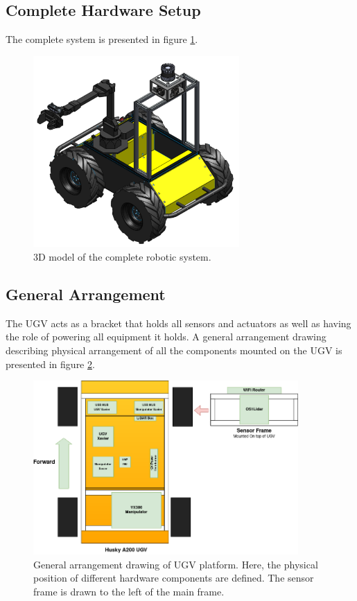 \subsection{Complete Hardware Setup}

The complete system is presented in figure \ref{fig:hardware}.

\begin{figure}[H]
  \centering
  \includegraphics[width = 0.7\textwidth]{Figures/husky_completed.pdf}
  \caption{3D model of the complete robotic system.}
  \label{fig:hardware}
\end{figure}

\subsection{General Arrangement}
The UGV acts as a bracket that holds all sensors and actuators as well as having the role of powering all equipment it holds. A general arrangement drawing describing physical arrangement of all the components mounted on the UGV is presented in figure \ref{fig:general_arrangement}.

\begin{figure}[H]
  \centering
   \includegraphics[width = 0.9\textwidth]{Figures/general_arrangement.drawio.png}
  \caption{General arrangement drawing of UGV platform. Here, the physical position of different hardware components are defined. The sensor frame is drawn to the left of the main frame.}
  \label{fig:general_arrangement}
\end{figure}

